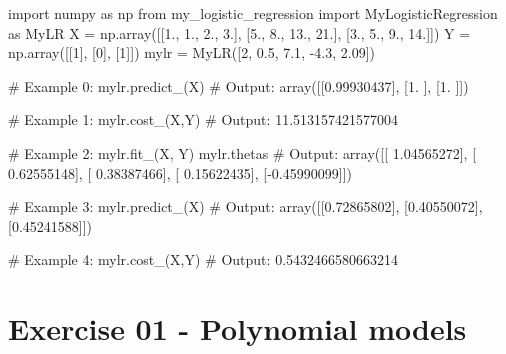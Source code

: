 \documentclass[]{article}
\newenvironment{Shaded}{\begin{snugshade}}{\end{snugshade}}
\newcommand{\CommentTok}[1]{\textcolor[rgb]{0.48,0.49,0.49}{#1}}
\newcommand{\DecValTok}[1]{\textcolor[rgb]{0.96,0.45,0.00}{#1}}
\newcommand{\FloatTok}[1]{\textcolor[rgb]{0.96,0.45,0.00}{#1}}
\newcommand{\ImportTok}[1]{\textcolor[rgb]{0.15,0.68,0.38}{#1}}
\newcommand{\NormalTok}[1]{\textcolor[rgb]{0.81,0.81,0.76}{#1}}
\newcommand{\OperatorTok}[1]{\textcolor[rgb]{0.81,0.81,0.76}{#1}}
\begin{document}
\begin{Shaded}
\begin{Highlighting}[]
\ImportTok{import}\NormalTok{ numpy }\ImportTok{as}\NormalTok{ np}
\ImportTok{from}\NormalTok{ my_logistic_regression }\ImportTok{import}\NormalTok{ MyLogisticRegression }\ImportTok{as}\NormalTok{ MyLR}
\NormalTok{X }\OperatorTok{=}\NormalTok{ np.array([[}\FloatTok{1.}\NormalTok{, }\FloatTok{1.}\NormalTok{, }\FloatTok{2.}\NormalTok{, }\FloatTok{3.}\NormalTok{], [}\FloatTok{5.}\NormalTok{, }\FloatTok{8.}\NormalTok{, }\FloatTok{13.}\NormalTok{, }\FloatTok{21.}\NormalTok{], [}\FloatTok{3.}\NormalTok{, }\FloatTok{5.}\NormalTok{, }\FloatTok{9.}\NormalTok{, }\FloatTok{14.}\NormalTok{]])}
\NormalTok{Y }\OperatorTok{=}\NormalTok{ np.array([[}\DecValTok{1}\NormalTok{], [}\DecValTok{0}\NormalTok{], [}\DecValTok{1}\NormalTok{]])}
\NormalTok{mylr }\OperatorTok{=}\NormalTok{ MyLR([}\DecValTok{2}\NormalTok{, }\FloatTok{0.5}\NormalTok{, }\FloatTok{7.1}\NormalTok{, }\FloatTok{-4.3}\NormalTok{, }\FloatTok{2.09}\NormalTok{])}

\CommentTok{# Example 0:}
\NormalTok{mylr.predict_(X)}
\CommentTok{# Output:}
\NormalTok{array([[}\FloatTok{0.99930437}\NormalTok{],}
\NormalTok{       [}\FloatTok{1.}\NormalTok{        ],}
\NormalTok{       [}\FloatTok{1.}\NormalTok{        ]])}

\CommentTok{# Example 1:}
\NormalTok{mylr.cost_(X,Y)}
\CommentTok{# Output:}
\FloatTok{11.513157421577004}

\CommentTok{# Example 2:}
\NormalTok{mylr.fit_(X, Y)}
\NormalTok{mylr.thetas}
\CommentTok{# Output:}
\NormalTok{array([[ }\FloatTok{1.04565272}\NormalTok{],}
\NormalTok{       [ }\FloatTok{0.62555148}\NormalTok{],}
\NormalTok{       [ }\FloatTok{0.38387466}\NormalTok{],}
\NormalTok{       [ }\FloatTok{0.15622435}\NormalTok{],}
\NormalTok{       [}\OperatorTok{-}\FloatTok{0.45990099}\NormalTok{]])}

\CommentTok{# Example 3:}
\NormalTok{mylr.predict_(X)}
\CommentTok{# Output:}
\NormalTok{array([[}\FloatTok{0.72865802}\NormalTok{],}
\NormalTok{       [}\FloatTok{0.40550072}\NormalTok{],}
\NormalTok{       [}\FloatTok{0.45241588}\NormalTok{]])}

\CommentTok{# Example 4:}
\NormalTok{mylr.cost_(X,Y)}
\CommentTok{# Output:}
\FloatTok{0.5432466580663214}
\end{Highlighting}
\end{Shaded}

\clearpage

\hypertarget{exercise-01---polynomial-models-1}{%
\section{Exercise 01 - Polynomial
models}\label{exercise-01---polynomial-models-1}}
\end{document}
